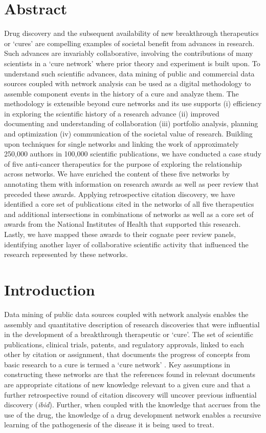 \documentclass[10pt,letterpaper]{article}
\begin{document}
\section*{Abstract}

Drug discovery and the subsequent availability of new breakthrough therapeutics or `cures' are compelling examples of societal benefit from advances in research. Such advances are invariably collaborative, involving the contributions of many scientists in a `cure network' where prior theory and experiment is built upon. To understand such scientific advances, data mining of public and commercial data sources coupled with network analysis can be used as a digital methodology to assemble component events in the history of a cure and analyze them. The methodology is extensible beyond cure networks and its use supports (i) efficiency in  exploring  the scientific history of a research advance (ii) improved documenting and understanding of collaboration (iii) portfolio analysis, planning and optimization (iv) communication of the societal value of research. Building upon techniques for single networks and linking the work of approximately 250,000 authors in 100,000 scientific publications, we have conducted a case study of five anti-cancer therapeutics for the purpose of exploring the relationship across networks. We have enriched the content of these five networks by annotating them with information on research awards as well as peer review that preceded these awards. Applying retrospective citation discovery, we have identified a core set of publications cited in the networks of all five therapeutics and additional intersections in combinations of networks as well as a core set of awards from the National Institutes of Health that supported this research. Lastly, we have mapped these awards to their cognate peer review panels, identifying another layer of collaborative scientific activity that influenced the research represented by these networks. 

\linenumbers

\section*{Introduction}

Data mining of public data sources coupled with network analysis enables the assembly and quantitative description of research discoveries that were influential in the development of a breakthrough therapeutic or `cure'.  The set of scientific publications, clinical trials, patents, and regulatory approvals, linked to each other by citation or assignment, that documents the progress of concepts from basic research to a cure is termed a `cure network' \cite {bibWilliams}. Key assumptions in constructing these networks are that the references found in relevant documents are appropriate citations of new knowledge relevant to a given cure and that a further retrospective round of citation discovery will uncover previous influential discovery (\textit{ibid}). Further, when coupled with the knowledge that accrues from the use of the drug, the knowledge of a drug development network enables a recursive learning of the pathogenesis of the disease it is being used to treat\cite{bibChan}. 
\end{document}
